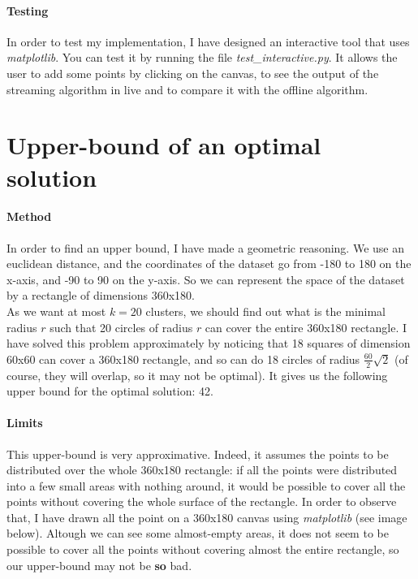 \documentclass[a4paper]{article}%
\begin{document}
	\paragraph{Testing} In order to test my implementation, I have designed an interactive tool that uses
	\textit{matplotlib}. You can test it by running the file \textit{test\_interactive.py}. It allows the user to
	add some points by clicking on the canvas, to see the output of the streaming algorithm in live and to compare it
	with the offline algorithm.

	\section{Upper-bound of an optimal solution}

	\paragraph{Method}
	In order to find an upper bound, I have made a geometric reasoning.
	We use an euclidean distance, and the coordinates of the dataset go from -180 to 180 on the x-axis, and -90 to 90 on the y-axis.
	So we can represent the space of the dataset by a rectangle of dimensions 360x180.\\

	As we want at most $k=20$ clusters, we should find out what is the minimal radius $r$ such that 20 circles of radius $r$
	can cover the entire 360x180 rectangle. I have solved this problem approximately by noticing that 18 squares of dimension 60x60
	can cover a 360x180 rectangle, and so can do 18 circles of radius $\frac{60}{2}\sqrt{2}$ (of course, they will overlap, so it may not be optimal).
	It gives us the following upper bound for the optimal solution: 42.

	\paragraph{Limits}

	This upper-bound is very approximative. Indeed, it assumes the points to be distributed over the whole 360x180 rectangle:
	if all the points were distributed into a few small areas with nothing around, it would be possible to cover all the points without covering
	the whole surface of the rectangle. In order to observe that, I have drawn all the point on a 360x180 canvas using \textit{matplotlib} (see image below).
	Altough we can see some almost-empty areas, it does not seem to be possible to cover all the points without covering almost the entire rectangle,
	so our upper-bound may not be \textbf{so} bad.\\
\end{document}
